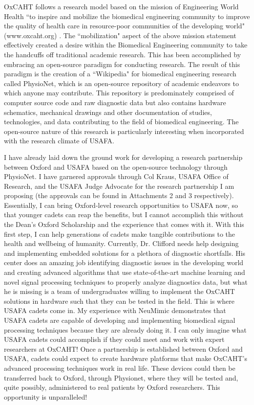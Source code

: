 \documentclass{article}
\begin{document}
OxCAHT follows a research model based on the mission of Engineering World
Health ``to inspire and mobilize the biomedical engineering community to improve
the quality of health care in resource-poor communities of the developing
world" (www.oxcaht.org) . The ``mobilization" aspect of the above mission
statement effectively created a desire within the Biomedical Engineering 
community to take the handcuffs off traditional academic research. This has
been accomplished by embracing an open-source paradigm for conducting research.
The result of this paradigm is the creation of a ``Wikipedia" for biomedical
engineering research called PhysioNet, which is an open-source repository of
academic endeavors to which anyone may contribute. This repository is
predominately comprised of computer source code and raw diagnostic data but
also contains hardware schematics, mechanical drawings and other documentation
of studies, technologies, and data contributing to the field of biomedical
engineering. The open-source nature of this research is particularly
interesting when incorporated with the research climate of USAFA.
 
I have already laid down the ground work for developing a research partnership between Oxford and USAFA based on the open-source
technology through PhysioNet. 
I have garnered approvals through Col Kraus, USAFA Office of Research, and the
USAFA Judge Advocate for the research partnership I am proposing (the
approvals can be found in Attachments 2 and 3
respectively). Essentially, I can bring Oxford-level research opportunities to USAFA
now, so that younger cadets can reap the benefits, but I cannot accomplish this without
the Dean's Oxford Scholarship and the experience that comes with it. With this first step,
I can help generations of cadets make tangible contributions to the health and wellbeing of humanity.
Currently, Dr. Clifford needs help designing and implementing embedded solutions
for a plethora of diagnostic shortfalls. His center does an amazing job
identifying diagnostic issues in the developing world and creating advanced algorithms that use
state-of-the-art machine learning and novel signal processing techniques to
properly analyze diagnostics data, but what he is missing is a team of
undergraduates willing to implement the OxCAHT solutions in hardware such that
they can be tested in the field. This is where USAFA cadets come in. My experience with 
NeuMimic demonstrates that USAFA cadets are capable of developing and implementing biomedical 
signal processing techniques because they are already doing it. I can only
imagine what USAFA cadets could accomplish if they could meet and work with
expert researchers at OxCAHT! Once a partnership is established between Oxford and USAFA,
cadets could expect to create hardware platforms that make OxCAHT's advanced processing techniques
work in real life. These devices could then be transferred back to Oxford, through Physionet,
where they will be tested and, quite possibly, administered to real patients by Oxford researchers.
This opportunity is unparalleled!
\end{document}
